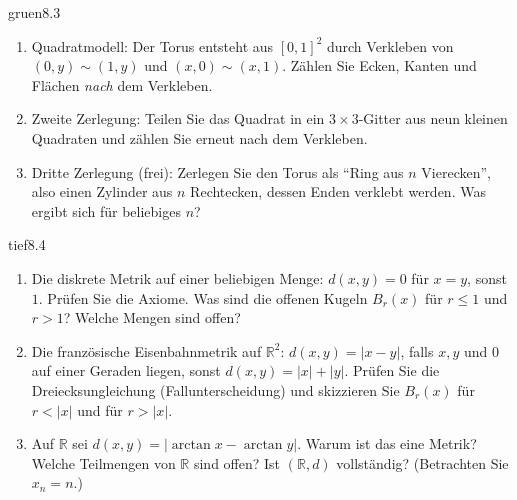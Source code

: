 \begin{karte}{gruen}{8.3}{\typwerk}{}
\begin{enumerate}[label=(\alph*),leftmargin=1.6em,itemsep=2pt]
\item Quadratmodell: Der Torus entsteht aus $[0, 1]^{2}$ durch Verkleben von $(0, y)\sim(1, y)$ und $(x, 0)\sim(x, 1)$. Zählen Sie Ecken, Kanten und Flächen \emph{nach} dem Verkleben.
\item Zweite Zerlegung: Teilen Sie das Quadrat in ein $3\times3$-Gitter aus neun kleinen Quadraten und zählen Sie erneut nach dem Verkleben.
\item Dritte Zerlegung (frei): Zerlegen Sie den Torus als \enquote{Ring aus $n$ Vierecken}, also einen Zylinder aus $n$ Rechtecken, dessen Enden verklebt werden. Was ergibt sich für beliebiges $n$?
\end{enumerate}
\end{karte}

\begin{karte}{tief}{8.4}{\typtypisch}{}
\begin{enumerate}[label=(\alph*),leftmargin=1.6em,itemsep=2pt]
\item Die diskrete Metrik auf einer beliebigen Menge: $d(x, y) = 0$ für $x = y$, sonst $1$. Prüfen Sie die Axiome. Was sind die offenen Kugeln $B_r(x)$ für $r\le1$ und $r > 1$? Welche Mengen sind offen?
\item Die französische Eisenbahnmetrik auf $\mathbb R^{2}$: $d(x, y) = |x - y|$, falls $x, y$ und $0$ auf einer Geraden liegen, sonst $d(x, y) = |x| + |y|$. Prüfen Sie die Dreiecksungleichung (Fallunterscheidung) und skizzieren Sie $B_r(x)$ für $r < |x|$ und für $r > |x|$.
\item Auf $\mathbb R$ sei $d(x, y) = |\arctan x - \arctan y|$. Warum ist das eine Metrik? Welche Teilmengen von $\mathbb R$ sind offen? Ist $(\mathbb R, d)$ vollständig? (Betrachten Sie $x_n = n$.)
\end{enumerate}
\end{karte}

